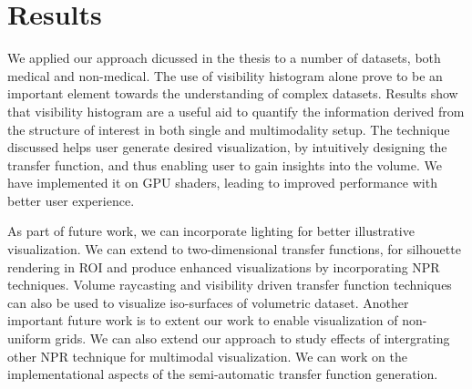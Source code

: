 
\chapter{Results}\label{chap:}

We applied our approach dicussed in the thesis to a number of datasets, both medical and non-medical. The use of visibility histogram alone prove to be an important element towards the understanding of complex datasets. Results show that visibility histogram are a useful aid to quantify the information derived from the structure of interest in both single and multimodality setup. The technique discussed helps user generate desired visualization, by intuitively designing the transfer function, and thus enabling user to gain insights into the volume. We have implemented it on GPU shaders, leading to improved performance with better user experience.  

As part of future work, we can incorporate lighting for better illustrative visualization. We can extend to two-dimensional transfer functions, for silhouette rendering in ROI and produce enhanced visualizations by incorporating NPR techniques. Volume raycasting and visibility driven transfer function techniques can also be used to visualize iso-surfaces of volumetric dataset. Another important future work is to extent our work to enable visualization of non-uniform grids. We can also extend our approach to study effects of intergrating other NPR technique for multimodal visualization. We can work on the implementational aspects of the semi-automatic transfer function generation.


 


